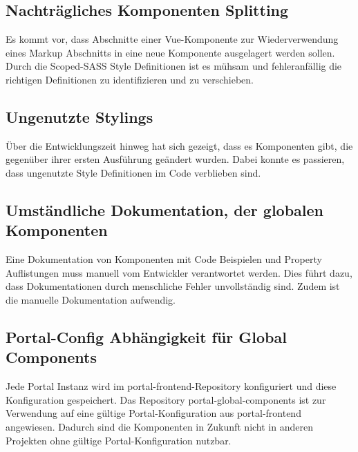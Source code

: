 \subsection{Nachträgliches Komponenten Splitting}
Es kommt vor, dass Abschnitte einer Vue-Komponente zur Wiederverwendung eines Markup Abschnitts in eine neue Komponente ausgelagert werden sollen. Durch die Scoped-SASS Style Definitionen ist es mühsam und fehleranfällig die richtigen Definitionen zu identifizieren und zu verschieben.
 
\subsection{Ungenutzte Stylings}
Über die Entwicklungszeit hinweg hat sich gezeigt, dass es Komponenten gibt, die gegenüber ihrer ersten Ausführung geändert wurden. Dabei konnte es passieren, dass ungenutzte Style Definitionen im Code verblieben sind.
 
\subsection{Umständliche Dokumentation, der globalen Komponenten}
Eine Dokumentation von Komponenten mit Code Beispielen und Property Auflistungen muss manuell vom Entwickler verantwortet werden. Dies führt dazu, dass Dokumentationen durch menschliche Fehler unvollständig sind. Zudem ist die manuelle Dokumentation aufwendig.
 
\subsection{Portal-Config Abhängigkeit für Global Components}
Jede Portal Instanz wird im portal-frontend-Repository konfiguriert und diese Konfiguration gespeichert. Das Repository portal-global-components ist zur Verwendung auf eine gültige Portal-Konfiguration aus portal-frontend angewiesen. Dadurch sind die Komponenten in Zukunft nicht in anderen Projekten ohne gültige Portal-Konfiguration nutzbar.
